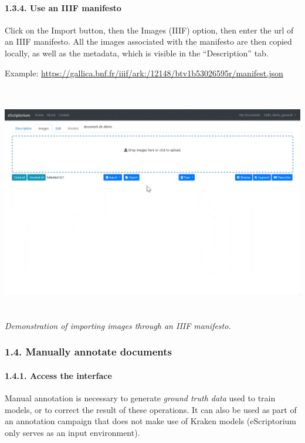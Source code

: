 \documentclass[
]{book}
\begin{document}
\hypertarget{use-an-iiif-manifesto}{%
\paragraph{1.3.4. Use an IIIF manifesto}\label{use-an-iiif-manifesto}}

Click on the Import button, then the Images (IIIF) option, then enter
the url of an IIIF manifesto. All the images associated with the
manifesto are then copied locally, as well as the metadata, which is
visible in the ``Description'' tab.

Example:
\url{https://gallica.bnf.fr/iiif/ark:/12148/btv1b53026595r/manifest.json}

\includegraphics[width=6.5in,height=4.08333in]{img/eScrTut/image8.gif}
\emph{Demonstration of importing images through an IIIF manifesto.}

\hypertarget{manually-annotate-documents}{%
\subsubsection{1.4. Manually annotate documents}\label{manually-annotate-documents}}

\hypertarget{access-the-interface-1}{%
\paragraph{1.4.1. Access the interface}\label{access-the-interface-1}}

Manual annotation is necessary to generate \emph{ground truth data} used to
train models, or to correct the result of these operations. It can also
be used as part of an annotation campaign that does not make use of
Kraken models (eScriptorium only serves as an input environment).
\end{document}
